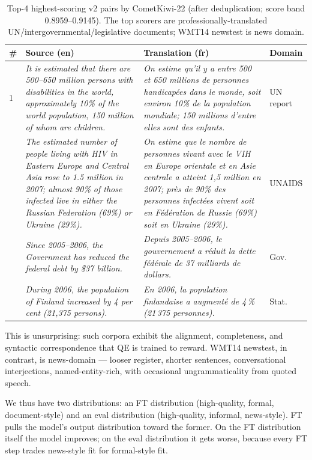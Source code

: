 \begin{table}[t]
\centering
\small
\begin{tabular}{p{0.5cm} p{6.5cm} p{6.5cm} p{2cm}}
\toprule
\# & Source (en) & Translation (fr) & Domain \\
\midrule
1 & \emph{It is estimated that there are 500--650 million persons with disabilities in the world, approximately 10\% of the world population, 150 million of whom are children.} & \emph{On estime qu'il y a entre 500 et 650 millions de personnes handicapées dans le monde, soit environ 10\% de la population mondiale; 150 millions d'entre elles sont des enfants.} & UN report \\
\addlinespace
2 & \emph{The estimated number of people living with HIV in Eastern Europe and Central Asia rose to 1.5 million in 2007; almost 90\% of those infected live in either the Russian Federation (69\%) or Ukraine (29\%).} & \emph{On estime que le nombre de personnes vivant avec le VIH en Europe orientale et en Asie centrale a atteint 1,5 million en 2007; près de 90\% des personnes infectées vivent soit en Fédération de Russie (69\%) soit en Ukraine (29\%).} & UNAIDS \\
\addlinespace
3 & \emph{Since 2005--2006, the Government has reduced the federal debt by \$37 billion.} & \emph{Depuis 2005--2006, le gouvernement a réduit la dette fédérale de 37 milliards de dollars.} & Gov. \\
\addlinespace
4 & \emph{During 2006, the population of Finland increased by 4 per cent (21,375 persons).} & \emph{En 2006, la population finlandaise a augmenté de 4\,\% (21\,375 personnes).} & Stat. \\
\bottomrule
\end{tabular}
\caption{Top-4 highest-scoring v2 pairs by CometKiwi-22 (after deduplication; score band 0.8959--0.9145). The top scorers are professionally-translated UN/intergovernmental/legislative documents; WMT14 newstest is news domain.}
\label{tab:top5_samples}
\end{table}

This is unsurprising: such corpora exhibit the alignment, completeness, and syntactic correspondence that QE is trained to reward. WMT14 newstest, in contrast, is news-domain --- looser register, shorter sentences, conversational interjections, named-entity-rich, with occasional ungrammaticality from quoted speech.

We thus have two distributions: an FT distribution (high-quality, formal, document-style) and an eval distribution (high-quality, informal, news-style). FT pulls the model's output distribution toward the former. On the FT distribution itself the model improves; on the eval distribution it gets worse, because every FT step trades news-style fit for formal-style fit.

